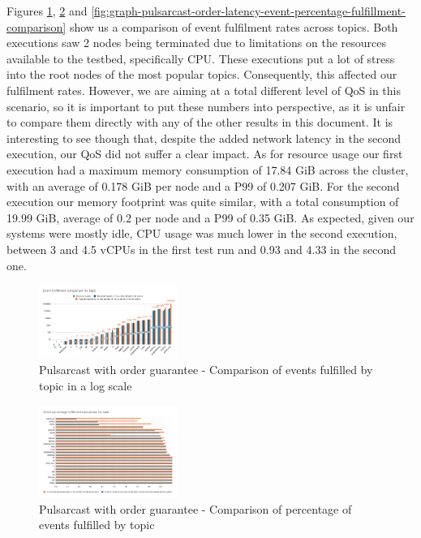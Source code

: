 Figures \ref{fig:graph-pulsarcast-order-event-fulfillment-comparison},
\ref{fig:graph-pulsarcast-order-event-percentage-fulfillment-comparison} and
\ref{fig:graph-pulsarcast-order-latency-event-percentage-fulfillment-comparison} show
us a comparison of event fulfilment rates across topics. Both executions saw 2
nodes being terminated due to limitations on the resources available to the
testbed, specifically CPU. These executions put a lot of stress into the root
nodes of the most popular topics. Consequently, this affected our fulfilment
rates. However, we are aiming at a total different level of QoS in this
scenario, so it is important to put these numbers into perspective, as it is
unfair to compare them directly with any of the other results in this document.
It is interesting to see though that, despite the added network latency in the
second execution, our QoS did not suffer a clear impact. As for resource usage
our first execution had a maximum memory consumption of 17.84 GiB across the
cluster, with an average of 0.178 GiB per node and a P99 of 0.207 GiB. For the
second execution our memory footprint was quite similar, with a total
consumption of 19.99 GiB, average of 0.2 per node and a P99 of 0.35 GiB. As
expected, given our systems were mostly idle, CPU usage was much lower in the
second execution, between 3 and 4.5 vCPUs in the first test run and 0.93 and
4.33 in the second one.

\begin{figure}[!htb]
  \centering
  \includegraphics[width=0.4\textwidth]{img/graph-pulsarcast-order-event-fulfillment-comparison.png}
  \caption{Pulsarcast with order guarantee - Comparison of events fulfilled by topic in a log scale}
  \label{fig:graph-pulsarcast-order-event-fulfillment-comparison}
\end{figure}

\begin{figure}[!htb]
  \centering
  \includegraphics[width=0.4\textwidth]{img/graph-pulsarcast-order-event-percentage-fulfillment-comparison.png}
  \caption{Pulsarcast with order guarantee - Comparison of percentage of events fulfilled by topic}
  \label{fig:graph-pulsarcast-order-event-percentage-fulfillment-comparison}
\end{figure}

